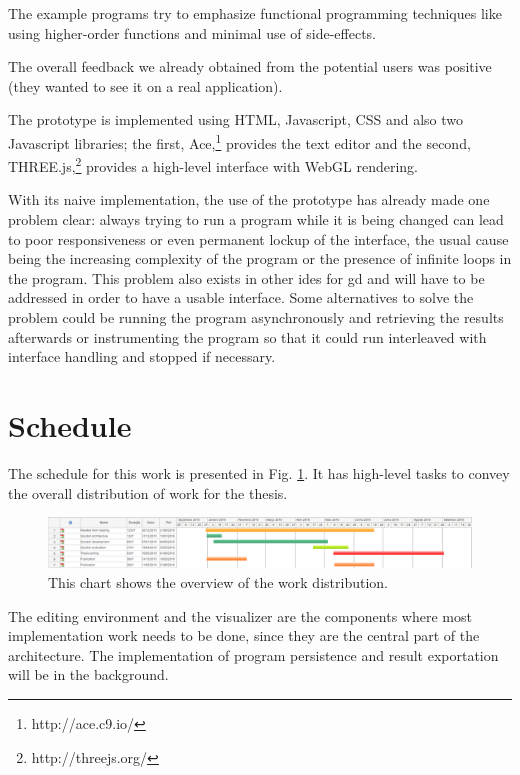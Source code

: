 \documentclass{./llncs2e/llncs}
\begin{document}
	The example programs try to emphasize functional programming techniques like using higher-order functions and minimal use of side-effects.

	The overall feedback we already obtained from the potential users was positive (they wanted to see it on a real application).

	The prototype is implemented using HTML, Javascript, CSS and also two Javascript libraries; the first, Ace,\footnote{http://ace.c9.io/} provides the text editor and the second, THREE.js,\footnote{http://threejs.org/} provides a high-level interface with WebGL rendering.

	With its naive implementation, the use of the prototype has already made one problem clear: always trying to run a program while it is being changed can lead to poor responsiveness or even permanent lockup of the interface, the usual cause being the increasing complexity of the program or the presence of infinite loops in the program. 
	This problem also exists in other \acp{ide} for \ac{gd} and will have to be addressed in order to have a usable interface. 
	Some alternatives to solve the problem could be running the program asynchronously and retrieving the results afterwards or instrumenting the program so that it could run interleaved with interface handling and stopped if necessary.

\section{Schedule}
	The schedule for this work is presented in Fig. \ref{fig:schedule}.
	It has high-level tasks to convey the overall distribution of work for the thesis.
	
	\begin{figure}
		\centering
		\includegraphics[width=1.0\textwidth]{img/schedule}
		\caption{This chart shows the overview of the work distribution.}
		\label{fig:schedule}
	\end{figure}
	
	The editing environment and the visualizer are the components where most implementation work needs to be done, since they are the central part of the architecture.
	The implementation of program persistence and result exportation will be in the background.
	
\end{document}
